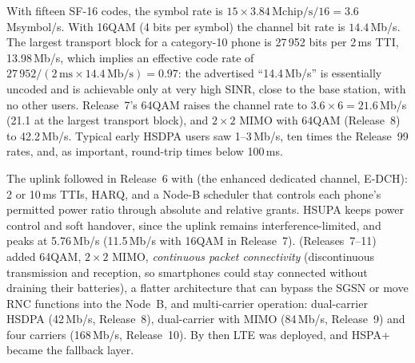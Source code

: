 
\begin{worked}
With fifteen SF-16 codes, the symbol rate is $15\times3.84\,\mathrm{Mchip/s}/16=3.6$\,Msymbol/s.
With 16QAM (4 bits per symbol) the channel bit rate is $14.4$\,Mb/s. The largest transport block for
a category-10 phone is 27\,952 bits per 2\,ms TTI, 13.98\,Mb/s, which implies an effective code rate
of $27\,952/(2\,\mathrm{ms}\times14.4\,\mathrm{Mb/s})=0.97$: the advertised ``14.4\,Mb/s'' is
essentially uncoded and is achievable only at very high SINR, close to the base station, with no
other users. Release~7's 64QAM raises the channel rate to $3.6\times6=21.6$\,Mb/s (21.1 at the
largest transport block), and $2\times2$ MIMO with 64QAM (Release~8) to 42.2\,Mb/s. Typical early
HSDPA users saw 1--3\,Mb/s, ten times the Release~99 rates, and, as important, round-trip times below
100\,ms.
\end{worked}

The uplink followed in Release~6 with  (the enhanced dedicated channel, E-DCH): 2 or
10\,ms TTIs, HARQ, and a Node-B scheduler that controls each phone's permitted power ratio through
absolute and relative grants. HSUPA keeps power control and soft handover, since the uplink remains
interference-limited, and peaks at 5.76\,Mb/s (11.5\,Mb/s with 16QAM in Release~7).
 (Releases~7--11) added 64QAM, $2\times2$ MIMO, \emph{continuous packet connectivity}
(discontinuous transmission and reception, so smartphones could stay connected without draining
their batteries), a flatter architecture that can bypass the SGSN or move RNC functions into the
Node~B, and multi-carrier operation: dual-carrier HSDPA (42\,Mb/s, Release~8), dual-carrier with
MIMO (84\,Mb/s, Release~9) and four carriers (168\,Mb/s, Release~10). By then LTE was deployed, and
HSPA+ became the fallback layer.


